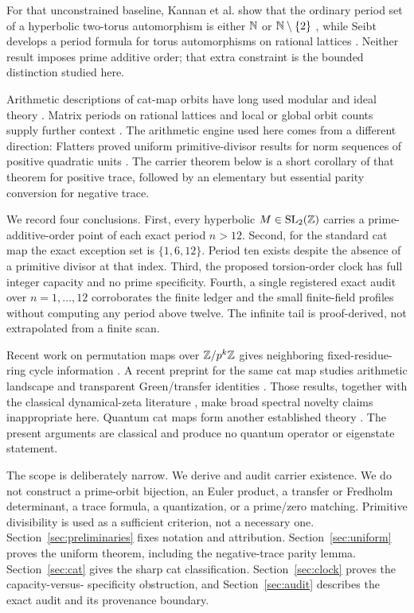 \documentclass[11pt]{article}
\theoremstyle{definition}
\theoremstyle{remark}
\begin{document}
For that unconstrained baseline, Kannan et al. show that the ordinary period
set of a hyperbolic two-torus automorphism is either \(\mathbb{N}\) or
\(\mathbb{N}\setminus\{2\}\) \citep{KannanEtAl2011Periods}, while Seibt develops a
period formula for torus automorphisms on rational lattices
\citep{Seibt2003Period}.  Neither result imposes prime additive order; that
extra constraint is the bounded distinction studied here.

Arithmetic descriptions of cat-map orbits have long used modular and ideal
theory \citep{PercivalVivaldi1987Arithmetic,Gaspari1994Arnold}.  Matrix
periods on rational lattices and local or global orbit counts supply further
context \citep{DysonFalk1992Period,BaakeRobertsWeiss2008Periodic,
BaakeNeumaerkerRoberts2013Orbit}.  The arithmetic engine used here comes
from a different direction: Flatters proved uniform primitive-divisor
results for norm sequences of positive quadratic units
\citep{Flatters2009Primitive}.  The carrier theorem below is a short
corollary of that theorem for positive trace, followed by an elementary but
essential parity conversion for negative trace.

We record four conclusions.  First, every hyperbolic
\(M\in\mathrm{SL}_2(\mathbb{Z})\) carries a prime-additive-order point of each exact period
\(n>12\).  Second, for the standard cat map the exact exception set is
\(\{1,6,12\}\).  Period ten exists despite the absence of a primitive
divisor at that index.  Third, the proposed torsion-order clock has full
integer capacity and no prime specificity.  Fourth, a single registered
exact audit over \(n=1,\ldots,12\) corroborates the finite ledger and the
small finite-field profiles without computing any period above twelve.
The infinite tail is proof-derived, not extrapolated from a finite scan.

Recent work on permutation maps over \(\mathbb{Z}/p^k\mathbb{Z}\) gives neighboring
fixed-residue-ring cycle information \citep{TanLi2025Graph}.  A recent
preprint for the same cat map studies arithmetic landscape and transparent
Green/transfer identities \citep{Chandra2026Arithmetic}.  Those results,
together with the classical dynamical-zeta literature
\citep{Ruelle1976Zeta,ParryPollicott1990Zeta}, make broad spectral novelty
claims inappropriate here.  Quantum cat maps form another established
theory \citep{HannayBerry1980Quantization,KurlbergRudnick2000Hecke}.  The
present arguments are classical and produce no quantum operator or
eigenstate statement.

The scope is deliberately narrow.  We derive and audit carrier existence.
We do not construct a prime-orbit bijection, an Euler product, a transfer or
Fredholm determinant, a trace formula, a quantization, or a prime/zero
matching.  Primitive divisibility is used as a sufficient criterion, not a
necessary one.  Section~\ref{sec:preliminaries} fixes notation and
attribution.  Section~\ref{sec:uniform} proves the uniform theorem, including
the negative-trace parity lemma.  Section~\ref{sec:cat} gives the sharp cat
classification.  Section~\ref{sec:clock} proves the capacity-versus-
specificity obstruction, and Section~\ref{sec:audit} describes the exact
audit and its provenance boundary.
\end{document}

